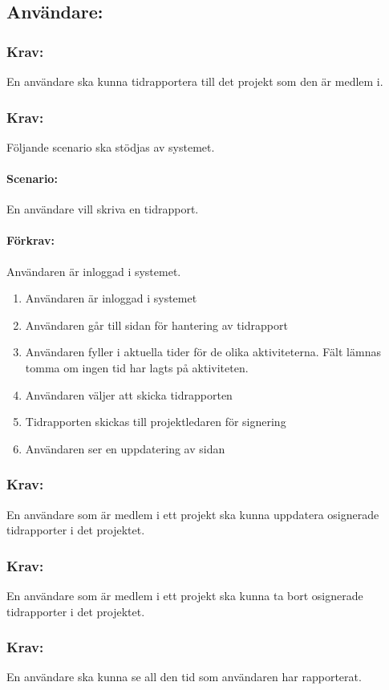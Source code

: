 \documentclass[paper=a4, fontsize=11pt,twoside]{article}
\begin{document}
	\subsection{Användare:}
	\subsubsection{Krav:} En användare ska kunna tidrapportera till det projekt som den är medlem i.
	\subsubsection{Krav:} Följande scenario ska stödjas av systemet.
	\paragraph{Scenario:} En användare vill skriva en tidrapport.
	\paragraph{Förkrav:}
	Användaren är inloggad i systemet.
	
	\begin{enumerate}
		\item	Användaren är inloggad i systemet
		\item 	Användaren går till sidan för hantering av tidrapport
		\item 	Användaren fyller i aktuella tider för de olika aktiviteterna. Fält lämnas tomma om ingen tid har lagts på aktiviteten.
		\item	Användaren väljer att skicka tidrapporten
		\item 	Tidrapporten skickas till projektledaren för signering
		\item 	Användaren ser en uppdatering av sidan
		
		
	\end{enumerate}
	
	\subsubsection{Krav:} En användare som är medlem i ett projekt ska kunna uppdatera osignerade tidrapporter i det projektet.
	\subsubsection{Krav:} En användare som är medlem i ett projekt ska kunna ta bort osignerade tidrapporter i det projektet.
	\subsubsection{Krav:} En användare ska kunna se all den tid som användaren har rapporterat.
\end{document}
